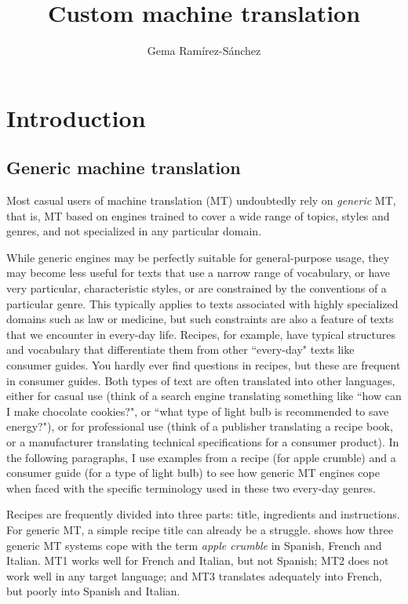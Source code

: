 \documentclass[output=paper]{langscibook}
\author{Gema Ramírez-Sánchez\affiliation{Prompsit Language Engineering}}
\title{Custom machine translation}
\begin{document}
\maketitle

\section{Introduction}

\subsection{Generic machine translation}

Most casual users of machine translation (MT) undoubtedly rely on \textit{generic} MT, that is, MT based on engines trained to cover a wide range of topics, styles and genres, and not specialized in any particular domain. 

While generic engines may be perfectly suitable for general-purpose usage, they may become less useful for texts that use a narrow range of vocabulary, or have very particular, characteristic styles, or are constrained by the conventions of a particular genre. This typically applies to texts associated with highly specialized domains such as law or medicine, but such constraints are  also a feature of texts that we encounter in every-day life. Recipes, for example, have typical structures and vocabulary that differentiate them from other “every-day" texts like consumer guides. You hardly ever find questions in recipes, but these are frequent in consumer guides. Both types of text are often translated into other languages, either for casual use (think of a search engine translating something like “how can I make chocolate cookies?", or “what type of light bulb is recommended to save energy?"), or for professional use (think of a publisher translating a recipe book, or a manufacturer translating technical specifications for a consumer product). In the following paragraphs, I use examples from a recipe (for apple crumble) and a consumer guide (for a type of light bulb) to see how generic MT engines cope when faced with the specific terminology used in these two every-day genres. 


Recipes are frequently divided into three parts: title, ingredients and instructions. For generic MT, a simple recipe title can already be a struggle.  shows how three generic MT systems cope with the term \textit{apple crumble} in Spanish, French and Italian. MT1 works well for French and Italian, but not Spanish; MT2 does not work well in any target language; and MT3 translates adequately into French, but poorly into Spanish and Italian.
\end{document}
